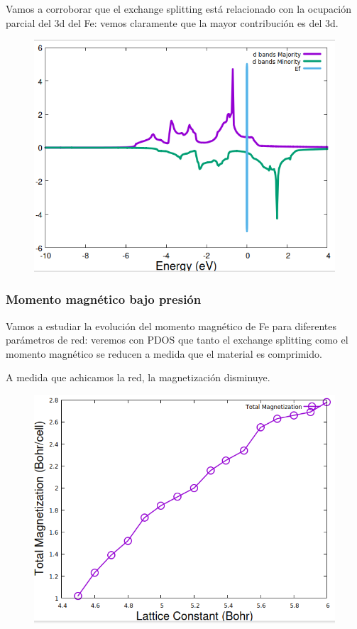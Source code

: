   Vamos a corroborar que el exchange splitting está relacionado con la ocupación parcial del 3d del Fe: vemos claramente que la mayor contribución es del 3d.
  \begin{figure}[H]
      \centering
      \includegraphics[scale = 0.6]{figs/D7/PDOS.png}
  \end{figure}

\subsubsection{Momento magnético bajo presión}

  Vamos a estudiar la evolución del momento magnético de Fe para diferentes parámetros de red: veremos con PDOS que tanto el exchange splitting como el momento magnético se reducen a medida que el material es comprimido.


  A medida que achicamos la red, la magnetización disminuye.
  \begin{figure}[H]
      \centering
      \includegraphics[scale = 0.6]{figs/D7/ex2.png}
  \end{figure}

